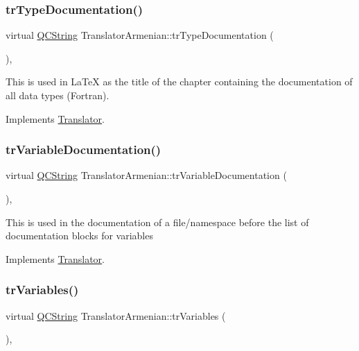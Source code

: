 \subsubsection{\texorpdfstring{trTypeDocumentation()}{trTypeDocumentation()}}
{\footnotesize\ttfamily virtual \mbox{\hyperlink{class_q_c_string}{Q\+C\+String}} Translator\+Armenian\+::tr\+Type\+Documentation (\begin{DoxyParamCaption}{ }\end{DoxyParamCaption})\hspace{0.3cm}{\ttfamily [inline]}, {\ttfamily [virtual]}}

This is used in La\+TeX as the title of the chapter containing the documentation of all data types (Fortran). 

Implements \mbox{\hyperlink{class_translator}{Translator}}.

\mbox{\label{class_translator_armenian_a2f9f14fd0e10cd9457948a5a703f1d15}} 
\subsubsection{\texorpdfstring{trVariableDocumentation()}{trVariableDocumentation()}}
{\footnotesize\ttfamily virtual \mbox{\hyperlink{class_q_c_string}{Q\+C\+String}} Translator\+Armenian\+::tr\+Variable\+Documentation (\begin{DoxyParamCaption}{ }\end{DoxyParamCaption})\hspace{0.3cm}{\ttfamily [inline]}, {\ttfamily [virtual]}}

This is used in the documentation of a file/namespace before the list of documentation blocks for variables 

Implements \mbox{\hyperlink{class_translator}{Translator}}.

\mbox{\label{class_translator_armenian_a8da9fc0799e4aa03974164fc8dce1557}} 
\subsubsection{\texorpdfstring{trVariables()}{trVariables()}}
{\footnotesize\ttfamily virtual \mbox{\hyperlink{class_q_c_string}{Q\+C\+String}} Translator\+Armenian\+::tr\+Variables (\begin{DoxyParamCaption}{ }\end{DoxyParamCaption})\hspace{0.3cm}{\ttfamily [inline]}, {\ttfamily [virtual]}}

